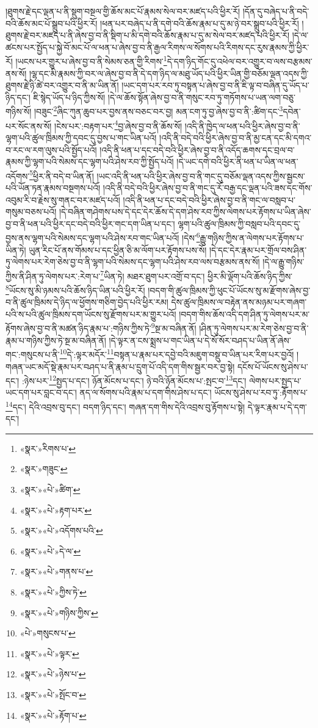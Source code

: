 །ཐུགས་རྗེ་དང་ལྡན་པ་ནི་སྡུག་བསྔལ་གྱི་ཆོས་མང་པོ་རྣམས་སེལ་བར་མཛད་པའི་ཕྱིར་རོ། །དོན་དུ་བཞེད་པ་ནི་བདེ་བའི་ཆོས་མང་པོ་སྒྲུབ་པའི་ཕྱིར་རོ། །ཕན་པར་བཞེད་པ་ནི་དགེ་བའི་ཆོས་རྣམ་པ་དུ་མ་ཉེ་བར་སྒྲུབ་པའི་ཕྱིར་རོ། །
ཐུགས་རྗེ་བར་མཛད་པ་ནི་ཞེས་བྱ་བ་ནི་སྡིག་པ་མི་དགེ་བའི་ཆོས་རྣམ་པ་དུ་མ་སེལ་བར་མཛད་པའི་ཕྱིར་རོ། །དེ་ལ་ཚངས་པར་སྤྱོད་པ་སྐྱེ་བོ་མང་པོ་ལ་ཕན་པ་ཞེས་བྱ་བ་ནི་རྒྱལ་རིགས་ལ་སོགས་པའི་རིགས་དང་རུས་རྣམས་ཀྱི་ཕྱིར་རོ། །ཡངས་པར་གྱུར་པ་ཞེས་བྱ་བ་ནི་སེམས་ཅན་གྱི་རིགས་\footnote{«སྣར་»རིགས་པ་}དེ་དག་ཉིད་གོང་དུ་འཕེལ་བར་འགྱུར་བ་ལས་བརྩམས་ནས་སོ། །ལྷ་དང་མི་རྣམས་ཀྱི་བར་ལ་ཞེས་བྱ་བ་ནི་དེ་དག་ཉིད་ལ་མཐུ་ཡོད་པའི་ཕྱིར་ཡིན་གྱི་བཅོམ་ལྡན་འདས་ཀྱི་ཐུགས་རྗེ་ཉི་ཚེ་བར་འགྱུར་བ་ནི་མ་ཡིན་ནོ། །ཡང་དག་པར་རབ་ཏུ་བསྟན་པ་ཞེས་བྱ་བ་ནི་ཇི་ལྟ་བ་བཞིན་དུ་ཡོད་པ་ཉིད་དང་། ཇི་སྙེད་ཡོད་པ་ཉིད་ཀྱིས་སོ། །དེ་ལ་ཆོས་སྟོན་ཞེས་བྱ་བ་ནི་གསུང་རབ་ཏུ་གཏོགས་པ་ཡན་ལག་བཅུ་གཉིས་སོ། །བཟུང་\footnote{«སྣར་»གཟུང་}ཞིང་ཀུན་ཆུབ་པར་བྱས་ནས་བཅང་བར་བྱ། མན་ངག་ཏུ་བྱ་ཞེས་བྱ་བ་ནི་:ཚིག་དང་\footnote{«སྣར་»«པེ་»ཚིག་}དབེན་པར་སོང་ནས་སོ། །ངེས་པར་:བརྟག་པར་\footnote{«སྣར་»«པེ་»རྟག་པར་}བྱ་ཞེས་བྱ་བ་ནི་ཆོས་སོ། །འདི་ནི་ཁྱེད་ལ་ཕན་པའི་ཕྱིར་ཞེས་བྱ་བ་ནི་ལྷག་པའི་ཚུལ་ཁྲིམས་ཀྱི་དབང་དུ་བྱས་པ་གང་ཡིན་པའོ། །འདི་ནི་བདེ་བའི་ཕྱིར་ཞེས་བྱ་བ་ནི་མྱ་ངན་དང་མི་དགའ་བ་རང་ལ་རག་ལུས་པའི་སྤྱོད་པའོ། །འདི་ནི་ཕན་པ་དང་བདེ་བའི་ཕྱིར་ཞེས་བྱ་བ་ནི་འདོད་ཆགས་དང་བྲལ་བ་རྣམས་ཀྱི་ལྷག་པའི་སེམས་དང་ལྷག་པའི་ཤེས་རབ་ཀྱི་སྤྱོད་པའོ། །དེ་ཡང་དགེ་བའི་ཕྱིར་ནི་ཕན་པ་ཡིན་ལ་ཕན་འདོགས་\footnote{«སྣར་»«པེ་»འདོགས་པའི་}ཕྱིར་ནི་བདེ་བ་ཡིན་ནོ། །ཡང་འདི་ནི་ཕན་པའི་ཕྱིར་ཞེས་བྱ་བ་ནི་གང་དུ་བཅོམ་ལྡན་འདས་ཀྱིས་སྦྱངས་པའི་ཡོན་ཏན་རྣམས་བསྔགས་པའོ། །འདི་ནི་བདེ་བའི་ཕྱིར་ཞེས་བྱ་བ་ནི་གང་དུ་རོ་བརྒྱ་དང་ལྡན་པའི་ཟས་དང་གོས་འབུམ་རི་བ་རྗེས་སུ་གནང་བར་མཛད་པའོ། །འདི་ནི་ཕན་པ་དང་བདེ་བའི་ཕྱིར་ཞེས་བྱ་བ་ནི་གང་ལ་བསླབ་པ་གསུམ་བཅས་པའོ། །དེ་བཞིན་གཤེགས་པས་དེ་དང་དེར་ཆོས་དེ་དག་ཤེས་རབ་ཀྱིས་ལེགས་པར་རྟོགས་པ་ཡིན་ཞེས་བྱ་བ་ནི་ཕན་པའི་ཕྱིར་དང་བདེ་བའི་ཕྱིར་གང་དག་ཡིན་པ་དང་། ལྷག་པའི་ཚུལ་ཁྲིམས་ཀྱི་བསླབ་པའི་དབང་དུ་བྱས་ནས་ལྷག་པའི་སེམས་དང་ལྷག་པའི་ཤེས་རབ་གང་ཡིན་པའོ། །དེས་\footnote{«སྣར་»«པེ་»དེ་ལ་}རྒྱུ་གཉིས་ཀྱིས་ན་ལེགས་པར་རྟོགས་པ་ཡིན་ཏེ། ཡུན་རིང་པོ་ནས་གོམས་པ་དང་ཕྱིན་ཅི་མ་ལོག་པར་རྟོགས་པས་སོ། །དེ་དང་དེར་རྣམ་པར་གྲོལ་བས་ཤིན་ཏུ་ལེགས་པར་རེག་ཅེས་བྱ་བ་ནི་ལྷག་པའི་སེམས་དང་ལྷག་པའི་ཤེས་རབ་ལས་བརྩམས་ནས་སོ། །དེ་ལ་རྒྱུ་གཉིས་ཀྱིས་ནི་ཤིན་ཏུ་ལེགས་པར་:རེག་པ་\footnote{«སྣར་»«པེ་»གནས་པ་}ཡིན་ཏེ། མཐར་ཐུག་པར་འགྲོ་བ་དང་། ཕྱིར་མི་ལྡོག་པའི་ཆོས་ཉིད་ཀྱིས་\footnote{«སྣར་»«པེ་»ཀྱིས་ཏེ་}ཡོངས་སུ་མི་ཉམས་པའི་ཆོས་ཉིད་ཡིན་པའི་ཕྱིར་རོ། །བདག་གི་ཚུལ་ཁྲིམས་ཀྱི་ཕུང་པོ་ཡོངས་སུ་མ་རྫོགས་ཞེས་བྱ་བ་ནི་ཚུལ་ཁྲིམས་དེ་ཉིད་ལ་ཕྱོགས་གཅིག་བྱེད་པའི་ཕྱིར་རམ། དེས་ཚུལ་ཁྲིམས་ལ་བརྟེན་ནས་མཉམ་པར་གཞག་པའི་ས་པའི་ཚུལ་ཁྲིམས་དག་ཡོངས་སུ་རྫོགས་པར་མ་གྱུར་པའོ། །བདག་གིས་ཆོས་འདི་དག་ཤིན་ཏུ་ལེགས་པར་མ་རྟོགས་ཞེས་བྱ་བ་ནི་མཚན་ཉིད་རྣམ་པ་:གཉིས་ཀྱིས་ཏེ་\footnote{«སྣར་»«པེ་»གཉིས་ཀྱིས་}སྔ་མ་བཞིན་ནོ། །ཤིན་ཏུ་ལེགས་པར་མ་རེག་ཅེས་བྱ་བ་ནི་རྣམ་པ་གཉིས་ཀྱིས་ཏེ་སྔ་མ་བཞིན་ནོ། །དེ་ལྟར་ན་ངས་སྨྲས་པ་གང་ཡིན་པ་དེ་སོ་སོར་བཤད་པ་ཡིན་ནོ་ཞེས་གང་:གསུངས་པ་ནི་\footnote{«པེ་»གསུངས་པ་}དེ་:ལྟར་མདོར་\footnote{«སྣར་»«པེ་»ལྟར་}བསྟན་པ་རྣམ་པར་དབྱེ་བའི་མཇུག་བསྡུ་བ་ཡིན་པར་རིག་པར་བྱའོ། །གཞན་ཡང་མདོ་སྡེ་རྣམ་པར་བཤད་པ་ནི་རྣམ་པ་དྲུག་པོ་འདི་དག་གིས་སྦྱར་བར་བྱ་སྟེ། དངོས་པོ་ཡོངས་སུ་ཤེས་པ་དང་། :ཉེས་པར་\footnote{«སྣར་»«པེ་»ཉེས་པ་}སྤྱད་པ་དང་། ཉོན་མོངས་པ་དང་། ཉེ་བའི་ཉོན་མོངས་པ་:སྤང་བ་\footnote{«སྣར་»«པེ་»སྤོང་བ་}དང་། ལེགས་པར་སྤྱད་པ་ཡང་དག་པར་བླང་བ་དང་། ནད་ལ་སོགས་པའི་རྣམ་པ་དག་གིས་ཤེས་པ་དང་། ཡོངས་སུ་ཤེས་པ་རབ་ཏུ་:རྟོགས་པ་\footnote{«སྣར་»«པེ་»རྟོག་པ་}དང་། དེའི་འབྲས་བུ་དང་། བདག་ཉིད་དང་། གཞན་དག་གིས་དེའི་འབྲས་བུ་རྟོགས་པ་སྟེ། དེ་ལྟར་རྣམ་པ་དེ་དག་དང་། 